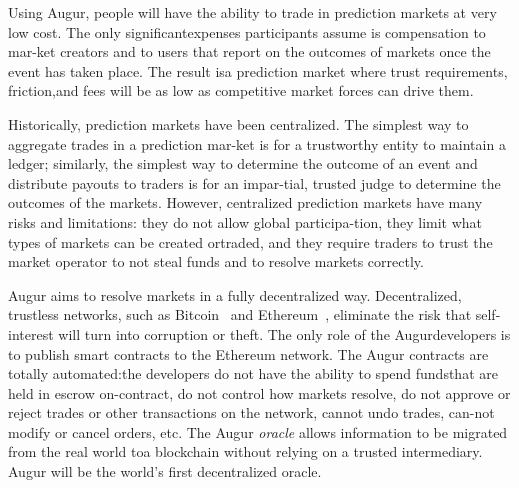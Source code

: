 \documentclass[12pt,floatfix,reprint,nofootinbib,amsmath,amssymb,epsfig,pre,floats,letterpaper,groupedaffiliation]{revtex4-1}
\theoremstyle{definition}
\theoremstyle{definition}
\begin{document}
Using Augur, people will have the ability to trade in prediction markets at very low cost. The only significant\linebreak expenses participants assume is compensation to mar-\linebreak ket creators and to users that report on the outcomes of markets once the event has taken place. The result is\linebreak a prediction market where trust requirements, friction,\linebreak and fees will be as low as competitive market forces can drive them.

Historically, prediction markets have been centralized. The simplest way to aggregate trades in a prediction mar-\linebreak ket is for a trustworthy entity to maintain a ledger; sim\-ilarly, the simplest way to determine the outcome of an event and distribute payouts to traders is for an impar-\linebreak tial, trusted judge to determine the outcomes of the mar\-kets. However, centralized prediction markets have many risks and limitations: they do not allow global participa-\linebreak tion, they limit what types of markets can be created or\linebreak traded, and they require traders to trust the market op\-erator to not steal funds and to resolve markets correctly.

Augur aims to resolve markets in a fully decentralized way. Decentralized, trustless networks, such as Bitcoin~\cite{Nakamoto_2008} and Ethereum~\cite{Buterin_2013}, eliminate the risk that self-interest will turn into corruption or theft. The only role of the Augur\linebreak developers is to publish smart contracts to the Ethereum network. The Augur contracts are totally automated:\linebreak the developers do not have the ability to spend funds\linebreak that are held in escrow on-contract, do not control how markets resolve, do not approve or reject trades or other transactions on the network, cannot undo trades, can-\linebreak not modify or cancel orders, etc. The Augur \textit{oracle} allows information to be migrated from the real world to\linebreak a blockchain without relying on a trusted intermediary. Augur will be the world's first decentralized oracle.
\end{document}
